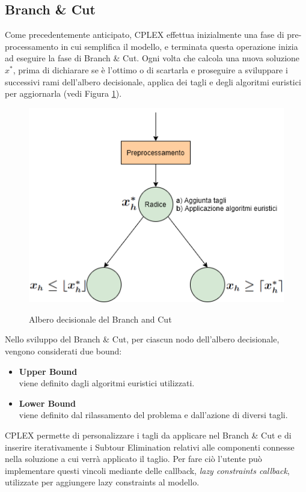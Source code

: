 \subsection{Branch \& Cut}
Come precedentemente anticipato, CPLEX effettua inizialmente una fase di pre-processamento in cui semplifica il modello, e terminata questa operazione inizia ad eseguire la fase di Branch \& Cut. Ogni volta che calcola una nuova soluzione $x^*$, prima di dichiarare se è l'ottimo o di scartarla e proseguire a sviluppare i successivi rami dell'albero decisionale, applica dei tagli e degli algoritmi euristici per aggiornarla (vedi Figura \ref{Albero_decisionale}).\\
\begin{figure}[h] 
\begin{center} 
  \includegraphics[scale=0.6]{Images/albero_decisionale}\\ 
  \caption{\footnotesize{Albero decisionale del Branch and Cut}}
  \label{Albero_decisionale} 
\end{center} 
\end{figure}
Nello sviluppo del Branch \& Cut, per ciascun nodo dell'albero decisionale, vengono considerati due bound:
\begin{itemize}
\item{\textbf{Upper Bound}\\
viene definito dagli algoritmi euristici utilizzati.
}
\item{\textbf{Lower Bound}\\
viene definito dal rilassamento del problema e dall'azione di diversi tagli.
}
\end{itemize}
CPLEX permette di personalizzare i tagli da applicare nel Branch \& Cut e di inserire iterativamente i Subtour Elimination relativi alle componenti connesse nella soluzione a cui verrà applicato il taglio. Per fare ciò l'utente può implementare questi vincoli mediante delle callback, \textit{lazy constraints callback}, utilizzate per aggiungere lazy constraints al modello.\\
